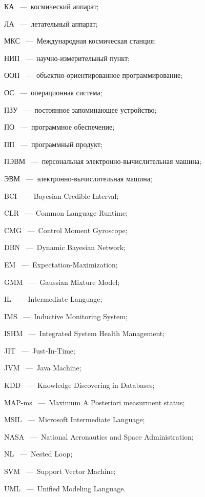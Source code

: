 \begin{abbreviation}
\item[КА]~---~космический аппарат;
\item[ЛА]~---~летательный аппарат;
\item[МКС]~---~Международная космическая станция;
\item[НИП]~---~научно-измерительный пункт;
\item[ООП]~---~объектно-ориентированное программирование;
\item[ОС]~---~операционная система;
\item[ПЗУ]~---~постоянное запоминающее устройство;
\item[ПО]~---~программное обеспечение;
\item[ПП]~---~программный продукт;
\item[ПЭВМ]~---~персональная электронно-вычислительная машина;
\item[ЭВМ]~---~электронно-вычислительная машина;
\smallskip
\item[BCI]~---~Bayesian Credible Interval;
\item[CLR]~---~Common Language Runtime;
\item[CMG]~---~Control Moment Gyroscope;
\item[DBN]~---~Dynamic Bayesian Network;
\item[EM]~---~Expectation-Maximization;
\item[GMM]~---~Gaussian Mixture Model;
\item[IL]~---~Intermediate Language;
\item[IMS]~---~Inductive Monitoring System;
\item[ISHM]~---~Integrated System Health Management;
\item[JIT]~---~Just-In-Time;
\item[JVM]~---~Java Machine;
\item[KDD]~---~Knowledge Discovering in Databases;
\item[MAP-ms]~---~Maximum A Posteriori measurment status;
\item[MSIL]~---~Microsoft Intermediate Language;
\item[NASA]~---~National Aeronautics and Space Administration;
\item[NL]~---~Nested Loop;
\item[SVM]~---~Support Vector Machine;
\item[UML]~---~Unified Modeling Language.
\end{abbreviation}